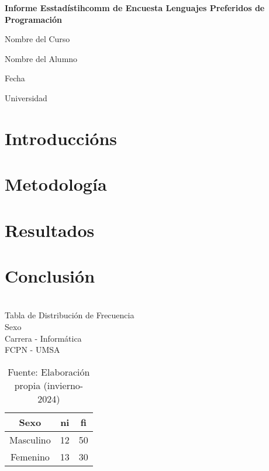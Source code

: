 \documentclass[12pt]{report}
\begin{document}
\begin{titlepage}
    \centering
    {\huge\bfseries Informe Esstadístihcomm de Encuesta Lenguajes Preferidos de Programación \par}
    \vspace{1cm}
    {\Large Nombre del Curso \par}
    \vspace{2cm}
    {\Large Nombre del Alumno \par}
    \vfill
    {\large Fecha \par}
    \vfill
    {\large Universidad \par}
\end{titlepage}

\tableofcontents
\newpage

\chapter{Introduccións}


\chapter{Metodología}


\chapter{Resultados}


\chapter{Conclusión}


\begin{table}[h!]
    \centering
    \caption{\\Tabla de Distribución de Frecuencia \\ Sexo \\ Carrera - Informática \\ FCPN - UMSA}
    \label{tab:distribucion_frecuencia}
    \begin{tabular}{|c|c|c|}
        \hline
        Sexo      & ni & fi \\ \hline
        Masculino & 12 & 50 \\ \hline
        Femenino  & 13 & 30 \\ \hline
    \end{tabular}
    \vspace{0.5cm}
    \caption*{Fuente: Elaboración propia (invierno-2024)}
\end{table}
\end{document}
